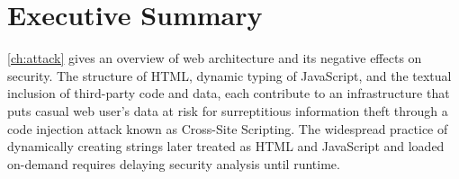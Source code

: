 \section{Executive Summary}


%

\autoref{ch:attack} gives an overview of web architecture and its negative effects on security.
The structure of HTML, dynamic typing of JavaScript, and the textual inclusion of third-party code and data, each contribute to an infrastructure that puts casual web user's data at risk for surreptitious information theft through a code injection attack known as Cross-Site Scripting.
The widespread practice of dynamically creating strings later treated as HTML and JavaScript and loaded on-demand requires delaying security analysis until runtime.

